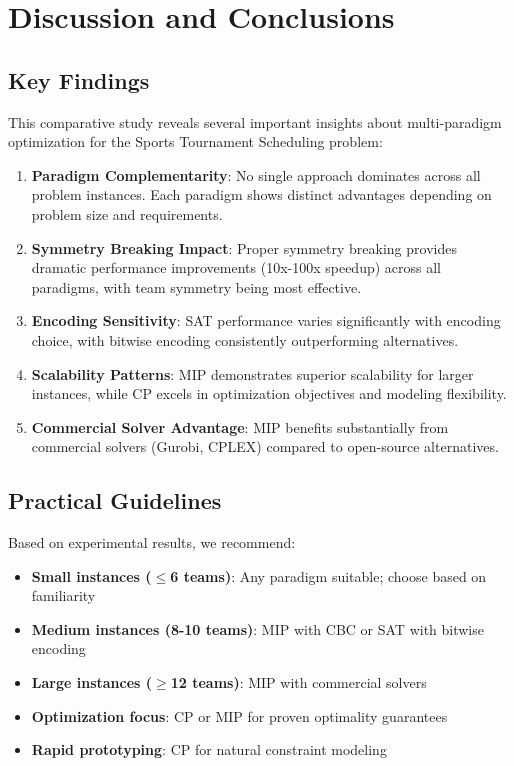 \documentclass[11pt]{article}
\begin{document}
\section{Discussion and Conclusions}

\subsection{Key Findings}

This comparative study reveals several important insights about multi-paradigm optimization for the Sports Tournament Scheduling problem:

\begin{enumerate}
    \item \textbf{Paradigm Complementarity}: No single approach dominates across all problem instances. Each paradigm shows distinct advantages depending on problem size and requirements.
    
    \item \textbf{Symmetry Breaking Impact}: Proper symmetry breaking provides dramatic performance improvements (10x-100x speedup) across all paradigms, with team symmetry being most effective.
    
    \item \textbf{Encoding Sensitivity}: SAT performance varies significantly with encoding choice, with bitwise encoding consistently outperforming alternatives.
    
    \item \textbf{Scalability Patterns}: MIP demonstrates superior scalability for larger instances, while CP excels in optimization objectives and modeling flexibility.
    
    \item \textbf{Commercial Solver Advantage}: MIP benefits substantially from commercial solvers (Gurobi, CPLEX) compared to open-source alternatives.
\end{enumerate}

\subsection{Practical Guidelines}

Based on experimental results, we recommend:

\begin{itemize}
    \item \textbf{Small instances ($\leq$6 teams)}: Any paradigm suitable; choose based on familiarity
    \item \textbf{Medium instances (8-10 teams)}: MIP with CBC or SAT with bitwise encoding
    \item \textbf{Large instances ($\geq$12 teams)}: MIP with commercial solvers
    \item \textbf{Optimization focus}: CP or MIP for proven optimality guarantees
    \item \textbf{Rapid prototyping}: CP for natural constraint modeling
\end{itemize}
\end{document}
